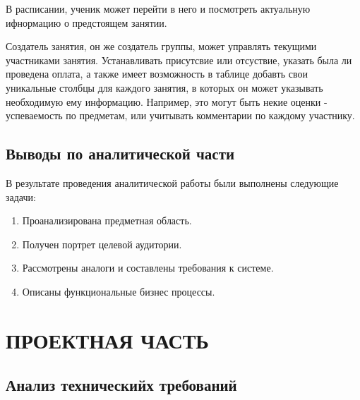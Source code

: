 \documentclass[a4paper,14pt,oneside]{extreport}
\begin{document}
 В расписании, ученик может перейти в него и посмотреть актуальную ифнормацию о предстоящем занятии.

 Создатель занятия, он же создатель группы, может управлять текущими участниками занятия. Устанавливать присутсвие или отсуствие, указать была ли проведена оплата, а также имеет возможность в таблице добавть свои уникальные столбцы для каждого занятия, в которых он может указывать необходимую ему информацию. Например, это могут быть некие оценки - успеваемость по предметам, или учитывать комментарии по каждому участнику.


 \section{Выводы по аналитической части}

 В результате проведения аналитической работы были выполнены следующие задачи:
 \begin{enumerate}
     \item Проанализирована предметная область.
     \item Получен портрет целевой аудитории.
     \item Рассмотрены аналоги и составлены требования к системе.
     \item Описаны функциональные бизнес процессы.
 \end{enumerate}


\newpage
\chapter{ПРОЕКТНАЯ ЧАСТЬ}

\section{Анализ техническийх требований}
\end{document}
